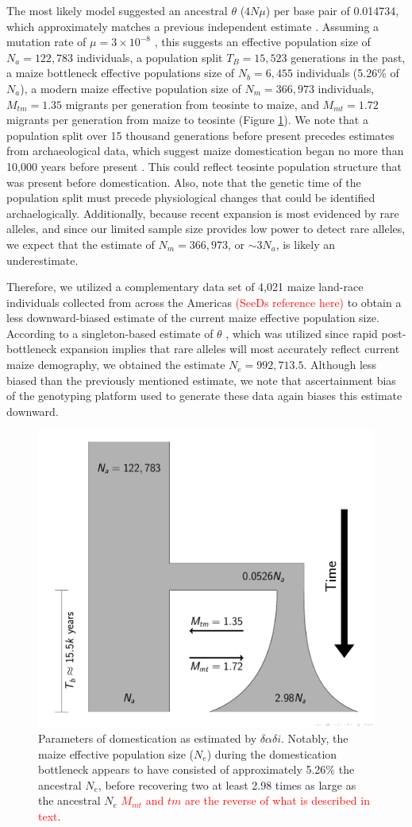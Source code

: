 \documentclass{pnastwo}
\newcommand{\jri}[1]{\textcolor{red}{\scriptsize #1}}
\begin{document}
\begin{article}
The most likely model suggested an ancestral $\theta$ ($4N\mu$) per base pair of
0.014734, which approximately matches a previous independent estimate \cite{eyre1998}. Assuming a mutation rate of $\mu =
3 \times 10^{-8}$ \cite{clark2005}, this suggests an effective
population size of $N_a = 122,783$ individuals, a population split
$T_B = 15,523$ generations in the past, a maize bottleneck
effective populations size of $N_b = 6,455$ individuals (5.26\% of
$N_a$), a modern maize effective population size of $N_m = 366,973$
individuals, $M_{tm} = 1.35$ migrants per generation from teosinte to
maize, and $M_{mt} = 1.72$ migrants per generation from maize to
teosinte (Figure \ref{fig:bottleneck}). We note that a population
split over 15 thousand generations before present precedes estimates
from
archaeological data, which suggest maize domestication began
no more than 10,000 years before present \cite{smith1995}. This could reflect teosinte population structure that was present before
domestication. Also, note that the genetic time of the population
split must precede physiological changes that could be identified
archaelogically.   Additionally, because recent expansion is
most evidenced by rare alleles, and since our limited sample size provides low
power to detect rare alleles, we expect that the estimate of  $N_m = 366,973$, or $\sim 3N_a$, is likely an underestimate.

Therefore, we utilized a complementary data set of 4,021 maize land-race individuals collected
from across the Americas \textcolor{red}{(SeeDs reference here)} to
obtain a less downward-biased estimate of the current maize effective
population size. According to a singleton-based estimate of $\theta$
\cite{fu1993}, which was utilized since rapid post-bottleneck expansion
implies that rare alleles will most accurately reflect current maize
demography, we obtained the estimate $N_e =
  992,713.5$. Although less biased than the previously mentioned
estimate, we note that ascertainment bias of the
genotyping platform used to generate these data again biases this
estimate downward.

\begin{figure}[!htb]
\centering
\includegraphics[width=.4\textwidth]{FigsAndFiles/DomesticationModel/domesticationModel.pdf}
\caption{Parameters of domestication as estimated by $\delta\alpha\delta{i}$. Notably,
  the maize effective population size ($N_e$) during the domestication
  bottleneck appears to have consisted of approximately 5.26\%
  the ancestral $N_e$, before recovering two at least 2.98
  times as large as the ancestral $N_e$ \jri{$M_{mt}$ and $tm$ are the reverse of what is described in text}. \label{fig:bottleneck} }
\end{figure}


\end{article}
\end{document}
